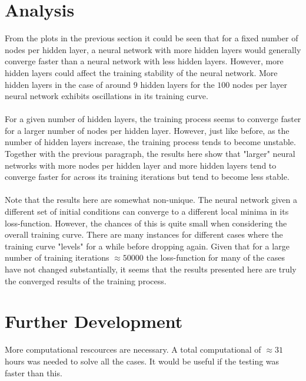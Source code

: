 \documentclass[a4paper, 12pt]{report}
\begin{document}
\begin{center}
\section{Analysis}

From the plots in the previous section it could be seen that for a fixed number of nodes per hidden layer, a neural network with more hidden layers would generally converge faster than a neural network with less hidden layers. However, more hidden layers could affect the training stability of the neural network. More hidden layers in the case of around $9$ hidden layers for the $100$ nodes per layer neural network exhibits oscillations in its training curve.
\\~\\For a given number of hidden layers, the training process seems to converge faster for a larger number of nodes per hidden layer. However, just like before, as the number of hidden layers increase, the training process tends to become unstable. Together with the previous paragraph, the results here show that "larger" neural networks with more nodes per hidden layer and more hidden layers tend to converge faster for across its training iterations but tend to become less stable.
\\~\\Note that the results here are somewhat non-unique. The neural network given a different set of initial conditions can converge to a different local minima in its loss-function. However, the chances of this is quite small when considering the overall training curve. There are many instances for different cases where the training curve "levels"  for a while before dropping again. Given that for a large number of training iterations $\approx 50000$ the loss-function for many of the cases have not changed substantially, it seems that the results presented here are truly the converged results of the training process.

\section{Further Development}

More computational rescources are necessary. A total computational of $\approx31$ hours was needed to solve all the cases. It would be useful if the testing was faster than this.

\end{center}
\end{document}
